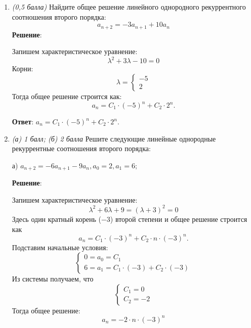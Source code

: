 \documentclass{article}
\begin{document}
  \begin{enumerate}
    \item \textit{(0,5 балла)} Найдите общее решение линейного однородного рекуррентного соотношения второго порядка:
    $$a_{n+2} = -3 a_{n+1} + 10 a_n$$
    \textbf{Решение}:
    
    Запишем характеристическое уравнение:
    \begin{equation}
      \lambda^2 + 3\lambda - 10 = 0
    \end{equation}
    Корни:
    \begin{equation}
      \lambda = \begin{cases}
        -5 \\
        2
      \end{cases}
    \end{equation}
    Тогда общее решение строится как:
    \begin{equation}
      a_n = C_1 \cdot (-5)^n + C_2 \cdot 2^n.
    \end{equation}

    \textbf{Ответ}:
    $a_n = C_1 \cdot (-5)^n + C_2 \cdot 2^n.$

    \item \textit{(а) 1 балл; (б) 2 балла} Решите следующие линейные однородные рекуррентные соотношения второго порядка:
    
    а) $a_{n+2} = -6a_{n+1} - 9a_n, a_0 = 2, a_1 = 6;$

    \textbf{Решение}:

    Запишем характеристическое уравнение:
    \begin{equation}
      \lambda^2 + 6\lambda + 9 = (\lambda + 3)^2 = 0
    \end{equation}
    Здесь один кратный корень ($-3$) второй степени и общее решение строится как
    \begin{equation}
      a_n = C_1 \cdot (-3)^n + C_2 \cdot n \cdot (-3)^n.
    \end{equation}
    Подставим начальные условия:
    \begin{equation}
      \begin{cases}
        0 = a_0 = C_1 \\
        6 = a_1 = C_1 \cdot (-3) + C_2 \cdot (-3)
      \end{cases}
    \end{equation}
    Из системы получаем, что
    \begin{equation}
      \begin{cases}
        C_1 = 0 \\
        C_2 = -2
      \end{cases}
    \end{equation}
    Тогда общее решение:
    \begin{equation}
      a_n = -2 \cdot n \cdot (-3)^n
    \end{equation}


\end{enumerate}
\end{document}
